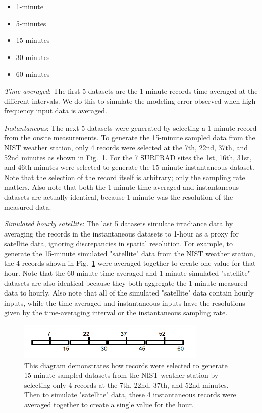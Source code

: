 \documentclass[conference]{IEEEtran}
\begin{document}
\begin{itemize}
    \item 1-minute
    \item 5-minutes
    \item 15-minutes
    \item 30-minutes
    \item 60-minutes
\end{itemize}

\emph{Time-averaged}: The first 5 datasets are the 1 minute records time-averaged at the different intervals. We do this to simulate the modeling error observed when high frequency input data is averaged.

\emph{Instantaneous}: The next 5 datasets were generated by selecting a 1-minute record from the onsite measurements. To generate the 15-minute sampled data from the NIST weather station, only 4 records were selected at the 7th, 22nd, 37th, and 52nd minutes as shown in Fig.~\ref{fig:sampling-diagram}. For the 7 SURFRAD sites the 1st, 16th, 31st, and 46th minutes were selected to generate the 15-minute instantaneous dataset. Note that the selection of the record itself is arbitrary; only the sampling rate matters. Also note that both the 1-minute time-averaged and instantaneous datasets are actually identical, because 1-minute was the resolution of the measured data.

\emph{Simulated hourly satellite}: The last 5 datasets simulate irradiance data by averaging the records in the instantaneous datasets to 1-hour as a proxy for satellite data, ignoring discrepancies in spatial resolution. For example, to generate the 15-minute simulated "satellite" data from the NIST weather station, the 4 records shown in Fig.~\ref{fig:sampling-diagram} were averaged together to create one value for that hour. Note that the 60-minute time-averaged and 1-minute simulated "satellite" datasets are also identical because they both aggregate the 1-minute measured data to hourly. Also note that all of the simulated "satellite" data contain hourly inputs, while the time-averaged and instantaneous inputs have the resolutions given by the time-averaging interval or the instantaneous sampling rate.

\begin{figure}[htbp]
\centerline{\includegraphics[width=9cm]{sampling-diagram.png}}
\caption{This diagram demonstrates how records were selected to generate 15-minute sampled datasets from the NIST weather station by selecting only 4 records at the 7th, 22nd, 37th, and 52nd minutes. Then to simulate "satellite" data, these 4 instantaneous records were averaged together to create a single value for the hour.}
\label{fig:sampling-diagram}
\end{figure}
\end{document}
